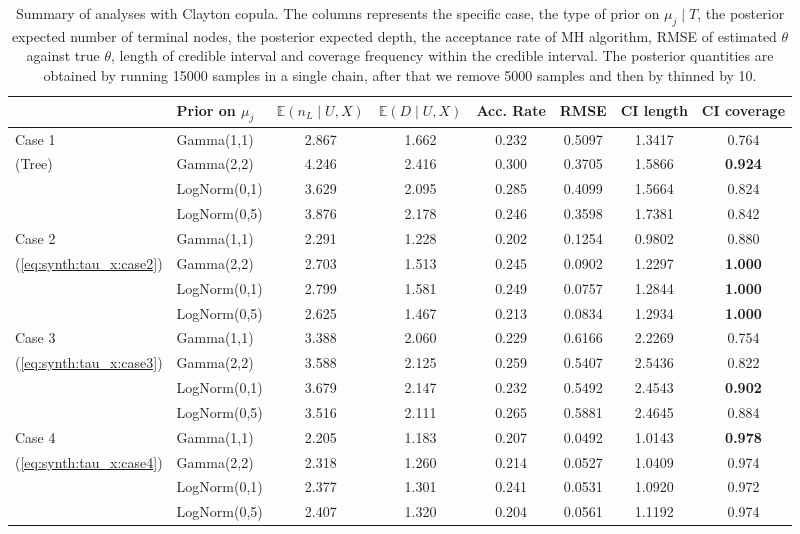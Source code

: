 \documentclass{amsart}
\begin{document}
\begin{table}[ht]
	\centering
	\caption{Summary of analyses with Clayton copula. The columns represents the specific case, the type of prior on $\mu_j\mid T$, the posterior expected number of terminal nodes, the posterior expected depth, the acceptance rate of MH algorithm, RMSE of estimated $\theta$ against true $\theta$, length of credible interval and coverage frequency within the credible interval. The posterior quantities are obtained by running 15000 samples in a single chain, after that we remove 5000 samples and then by thinned by 10.}
	\label{tab:clayton:summary}
	\scriptsize{
		\begin{tabular}{ll|cccccc}
			\toprule
			& Prior on $\mu_j$ & $\mathbb{E}(n_L\mid U,X)$ & $\mathbb{E}(D\mid U,X)$ & Acc. Rate & RMSE & CI length & CI coverage \\ 
			\midrule
			Case 1 & Gamma(1,1) & 2.867 & 1.662 & 0.232 & 0.5097 & 1.3417 & 0.764 \\ 
			(Tree) & Gamma(2,2) & 4.246 & 2.416 & 0.300 & 0.3705 & 1.5866 & \textbf{0.924} \\ 
			& LogNorm(0,1) & 3.629 & 2.095 & 0.285 & 0.4099 & 1.5664 & 0.824 \\ 
			& LogNorm(0,5) & 3.876 & 2.178 & 0.246 & 0.3598 & 1.7381 & 0.842 \\ 
			\midrule
			Case 2 & Gamma(1,1) & 2.291 & 1.228 & 0.202 & 0.1254 & 0.9802 & 0.880 \\ 
			(\cref{eq:synth:tau_x:case2}) & Gamma(2,2) & 2.703 & 1.513 & 0.245 & 0.0902 & 1.2297 & \textbf{1.000} \\ 
			& LogNorm(0,1) & 2.799 & 1.581 & 0.249 & 0.0757 & 1.2844 & \textbf{1.000} \\ 
			& LogNorm(0,5) & 2.625 & 1.467 & 0.213 & 0.0834 & 1.2934 & \textbf{1.000} \\ 
			\midrule
			Case 3 & Gamma(1,1) & 3.388 & 2.060 & 0.229 & 0.6166 & 2.2269 & 0.754 \\ 
			(\cref{eq:synth:tau_x:case3}) & Gamma(2,2) & 3.588 & 2.125 & 0.259 & 0.5407 & 2.5436 & 0.822 \\ 
			& LogNorm(0,1) & 3.679 & 2.147 & 0.232 & 0.5492 & 2.4543 & \textbf{0.902} \\ 
			& LogNorm(0,5) & 3.516 & 2.111 & 0.265 & 0.5881 & 2.4645 & 0.884 \\ 
			\midrule
			Case 4 & Gamma(1,1) & 2.205 & 1.183 & 0.207 & 0.0492 & 1.0143 & \textbf{0.978} \\ 
			(\cref{eq:synth:tau_x:case4}) & Gamma(2,2) & 2.318 & 1.260 & 0.214 & 0.0527 & 1.0409 & 0.974 \\ 
			& LogNorm(0,1) & 2.377 & 1.301 & 0.241 & 0.0531 & 1.0920 & 0.972 \\ 
			& LogNorm(0,5) & 2.407 & 1.320 & 0.204 & 0.0561 & 1.1192 & 0.974 \\ 
	\end{tabular}}
\end{table}
\end{document}
